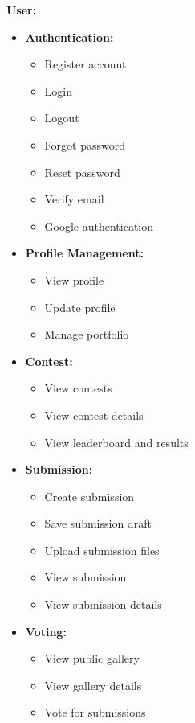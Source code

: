 \textbf{User:}
\begin{itemize}[leftmargin=1.5em, nosep]
    \item \textbf{Authentication:}
    \begin{itemize}[leftmargin=1.5em, nosep]
        \item Register account
        \item Login
        \item Logout
        \item Forgot password
        \item Reset password
        \item Verify email
        \item Google authentication
    \end{itemize}
    \item \textbf{Profile Management:}
    \begin{itemize}[leftmargin=1.5em, nosep]
        \item View profile
        \item Update profile
        \item Manage portfolio
    \end{itemize}
    \item \textbf{Contest:}
    \begin{itemize}[leftmargin=1.5em, nosep]
        \item View contests
        \item View contest details
        \item View leaderboard and results
    \end{itemize}
    \item \textbf{Submission:}
    \begin{itemize}[leftmargin=1.5em, nosep]
        \item Create submission
        \item Save submission draft
        \item Upload submission files
        \item View submission
        \item View submission details
    \end{itemize}
    \item \textbf{Voting:}
    \begin{itemize}[leftmargin=1.5em, nosep]
        \item View public gallery
        \item View gallery details
        \item Vote for submissions
    \end{itemize}
\end{itemize}

